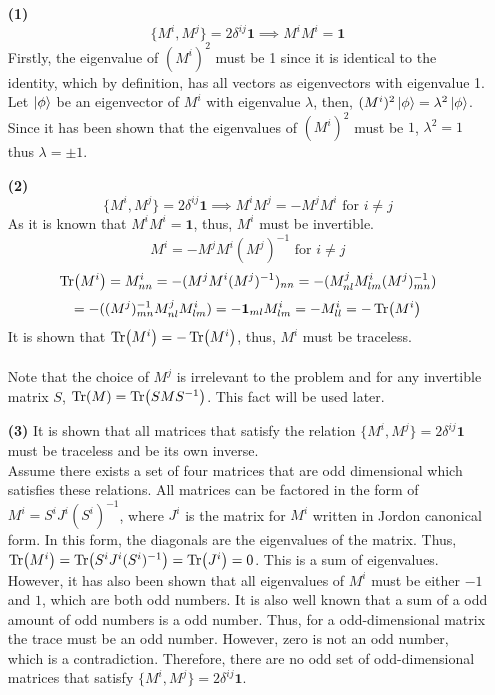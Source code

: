 \begin{sol}
\begin{enumerate}
\item[\textbf{(1)}]
$$\{M^i,M^j\}=2\delta^{ij}\mathbf{1}\implies M^iM^i=\mathbf{1}$$  
Firstly, the eigenvalue of $(M^i)^2$ must be 1 since it is identical to the identity, which by definition, has all vectors as eigenvectors with eigenvalue 1. 
Let $\ket\phi$ be an eigenvector of $M^i$ with eigenvalue $\lambda$, then, $(M^i)^2\ket\phi=\lambda^2\ket\phi$. Since it has been shown that the eigenvalues of $(M^i)^2$ must be $1$, $\lambda^2=1$ thus $\lambda=\pm 1$.
\item[\textbf{(2)}]
$$\{M^i,M^j\}=2\delta^{ij}\mathbf{1}\implies M^iM^j=-M^jM^i\text{ for }i\neq j$$
As it is known that $M^iM^i=\mathbf{1}$, thus, $M^i$ must be invertible.
$$M^i=-M^jM^i(M^j)^{-1}\text{ for }i\neq j$$
$$\Tr(M^i)=M^i_{nn}=-(M^jM^i(M^j)^{-1})_{nn}=-(M^j_{nl}M^i_{lm}(M^j)^{-1}_{mn})$$
$$=-((M^j)^{-1}_{mn}M^j_{nl}M^i_{lm})=-\mathbf 1_{ml}M^i_{lm}=-M^i_{ll}=-\Tr(M^i)$$
It is shown that $\Tr(M^i)=-\Tr(M^i)$, thus, $M^i$ must be traceless.\\\\Note that the choice of $M^j$ is irrelevant to the problem and for any invertible matrix $S$, $\Tr(M)=\Tr(SMS^{-1})$. This fact will be used later.
\item[\textbf{(3)}]
It is shown that all matrices that satisfy the relation $\{M^i,M^j\}=2\delta^{ij}\mathbf{1}$ must be traceless and be its own inverse.\\
Assume there exists a set of four matrices that are odd dimensional which satisfies these relations. All matrices can be factored in the form of $M^i=S^iJ^i(S^i)^{-1}$, where $J^i$ is the matrix for $M^i$ written in Jordon canonical form. In this form, the diagonals are the eigenvalues of the matrix. Thus, $\Tr(M^i)=\Tr(S^iJ^i(S^i)^{-1})=\Tr(J^i)=0$. This is a sum of eigenvalues. However, it has also been shown that all eigenvalues of $M^i$ must be either $-1$ and $1$, which are both odd numbers. It is also well known that a sum of a odd amount of odd numbers is a odd number. Thus, for a odd-dimensional matrix the trace must be an odd number. However, zero is not an odd number, which is a contradiction. Therefore, there are no odd set of odd-dimensional matrices that satisfy $\{M^i,M^j\}=2\delta^{ij}\mathbf{1}$.
\end{enumerate}
\end{sol}